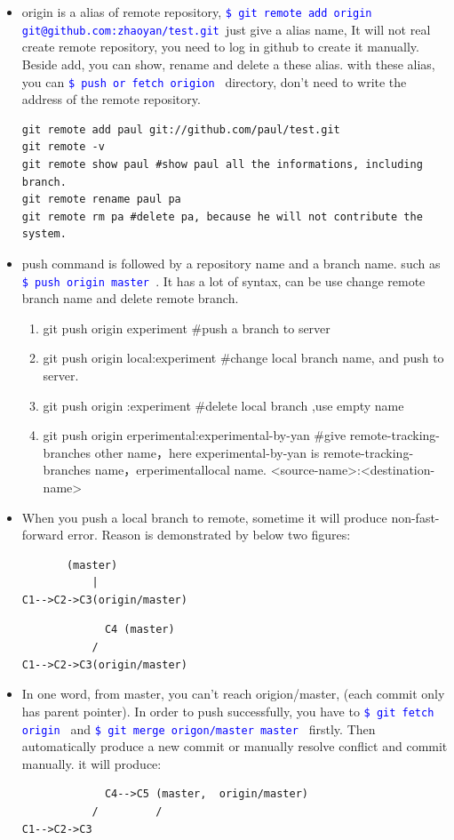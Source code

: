 \documentclass[a4paper,12pt,twoside]{book}
\newcommand{\linuxcommand}[1]{\texttt{\textcolor{blue}{\$ #1 \Pisymbol{psy}{191}}}}
\begin{document}
\begin{itemize}
\begin{itemize}
\item origin is a alias of remote repository,  \linuxcommand{git remote add origin
    git@github.com:zhaoyan/test.git}just give a alias name, It will not real create remote repository, you need to log in github to create it manually.  Beside add, you can show, rename and delete a these alias. with these alias, you can \linuxcommand{push or fetch origion} directory, don't need to write the address of the remote repository.

\begin{verbatim}
git remote add paul git://github.com/paul/test.git
git remote -v
git remote show paul #show paul all the informations, including branch.
git remote rename paul pa
git remote rm pa #delete pa, because he will not contribute the system.
\end{verbatim}

\item push command is followed by a repository name and a branch name.  such as \linuxcommand{push origin master}. It has a lot of syntax, can be use change remote branch name and delete remote branch.
\begin{enumerate}
\item git push origin experiment \#push a branch to server
\item git push origin local:experiment \#change local branch name, and push to server.  \item git push origin :experiment \#delete local branch ,use empty name 
\item git push origin erperimental:experimental-by-yan \#give remote-tracking-branches other name，here experimental-by-yan is remote-tracking-branches name，erperimentallocal name. <source-name>:<destination-name>
\end{enumerate}

\item When you push a local branch to remote, sometime it will produce non-fast-forward error. Reason is
    demonstrated by below two figures:
\begin{verbatim}
       (master)
           |
C1-->C2->C3(origin/master)
\end{verbatim}

\begin{verbatim}
             C4 (master)
           /
C1-->C2->C3(origin/master)
\end{verbatim}
\item In one word, from master, you can't reach origion/master, (each commit only has parent pointer).  In order to
push successfully, you have to \linuxcommand{git fetch origin} and \linuxcommand{git merge origon/master
master} firstly. Then automatically produce a new commit or manually resolve conflict and commit manually. it
will produce:
\begin{verbatim}
             C4-->C5 (master,  origin/master)
           /         /
C1-->C2->C3
\end{verbatim}



\end{itemize}
\end{itemize}
\end{document}
